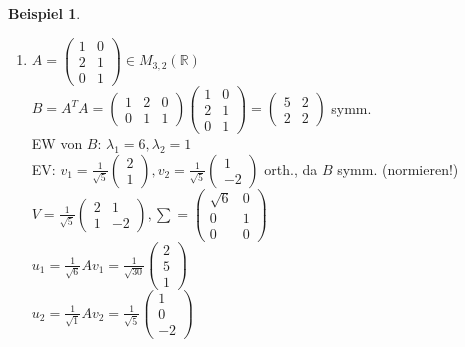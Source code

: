 \documentclass[a4paper,11pt]{article}
\newtheorem{bsp}[definition]{Beispiel}
\begin{document}
\begin{bsp}
\end{bsp}
\begin{enumerate}[label=\alph*)]
	\item $A=\begin{pmatrix}1&0\\2&1\\0&1\end{pmatrix}\in M_{3,2}(\mathbb{R})$ \\
	$B=A^TA=\begin{pmatrix}1&2&0\\0&1&1\end{pmatrix}\begin{pmatrix}1&0\\2&1\\0&1\end{pmatrix}=\begin{pmatrix}5&2\\2&2\end{pmatrix}$ symm. \\
	EW von $B$:  $\lambda_1=6,\lambda_2=1$ \\
	EV: $v_1=\frac{1}{\sqrt{5}}\begin{pmatrix}2\\1\end{pmatrix}, v_2=\frac{1}{\sqrt{5}}\begin{pmatrix}1\\-2\end{pmatrix}$ orth., da $B$ symm. (normieren!) \\
	$V=\frac{1}{\sqrt{5}}\begin{pmatrix}2&1\\1&-2\end{pmatrix}, \sum=\begin{pmatrix}\sqrt{6}&0\\0&1\\0&0\end{pmatrix}$ \\
	$u_1=\frac{1}{\sqrt{6}}Av_1=\frac{1}{\sqrt{30}}\begin{pmatrix}2\\5\\1\end{pmatrix}$ \\
	$u_2=\frac{1}{\sqrt{1}}Av_2=\frac{1}{\sqrt{5}}\begin{pmatrix}1\\0\\-2\end{pmatrix}$ \\

\end{enumerate}
\end{document}
